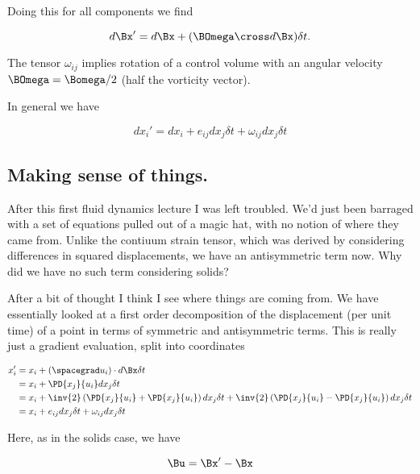 Doing this for all components we find

\begin{equation}\label{eqn:continuumL8:430}
d\Bx' = d\Bx + (\BOmega \cross d\Bx) \delta t.
\end{equation}

The tensor $\omega_{ij}$ implies rotation of a control volume with an angular velocity $\BOmega = \Bomega/2$ (half the vorticity vector).

In general we have

\begin{equation}\label{eqn:continuumL8:450}
dx_i' = dx_i + e_{ij} dx_j \delta t + \omega_{ij} dx_j \delta t
\end{equation}

\subsection{Making sense of things.}

After this first fluid dynamics lecture I was left troubled.  We'd just been barraged with a set of equations pulled out of a magic hat, with no notion of where they came from.  Unlike the contiuum strain tensor, which was derived by considering differences in squared displacements, we have an antisymmetric term now.  Why did we have no such term considering solids?

After a bit of thought I think I see where things are coming from.  We have essentially looked at a first order decomposition of the displacement (per unit time) of a point in terms of symmetric and antisymmetric terms.  This is really just a gradient evaluation, split into coordinates

\begin{align*}
x_i' 
&= x_i + (\spacegrad u_i) \cdot d\Bx \delta t \\
&= x_i + \PD{x_j}{u_i} dx_j \delta t \\
&= x_i + 
\inv{2}
\left(\PD{x_j}{u_i} 
+\PD{x_j}{u_i} 
\right)
dx_j \delta t 
+
\inv{2}
\left(\PD{x_j}{u_i} 
-\PD{x_j}{u_i} 
\right)
dx_j \delta t  \\
&=
x_i + e_{ij} dx_j \delta t + \omega_{ij} dx_j \delta t
\end{align*}

Here, as in the solids case, we have

\begin{equation}\label{eqn:continuumL8:470}
\Bu = \Bx' - \Bx
\end{equation}

%

\EndArticle
